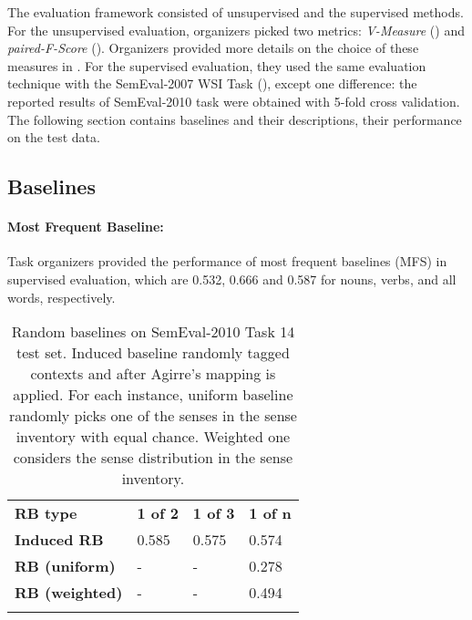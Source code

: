 The evaluation framework consisted of unsupervised and the supervised methods. For the unsupervised evaluation, organizers picked two metrics: \emph{V-Measure} (\cite{rosenberg07vmeasure}) and \emph{paired-F-Score} (\cite{artiles09weps}). Organizers provided more details on the choice of these measures in \cite{manandhar2010semeval}. For the supervised evaluation, they used the same evaluation technique with the SemEval-2007 WSI Task (\cite{agirre07semeval}), except one difference: the reported results of SemEval-2010 task were obtained with 5-fold cross validation.  \\

The following section contains baselines and their descriptions, their performance on the test data. 



\subsection{Baselines}
\label{semeval10-baselines}

\paragraph{Most Frequent Baseline:} Task organizers provided the performance of most frequent baselines (MFS) in supervised evaluation, which are 0.532, 0.666 and 0.587 for nouns, verbs, and all words, respectively.

\begin{table}
\begin{center}
    \begin{tabular}{  l | l | l | l }
    \Xhline{2\arrayrulewidth}  \bf RB type  & \bf 1 of 2 & \bf 1 of 3 & \bf 1 of n \\ \Xhline{2\arrayrulewidth}
    \bf Induced RB & 0.585 & 0.575 & 0.574 \\ \hline
    \bf RB (uniform) & - & - & 0.278 \\ 
    \bf RB (weighted) & - & - & 0.494 \\ \Xhline{2\arrayrulewidth}
    \end{tabular}
\end{center}
    \caption{\label{table:semeval10-random-baseline} Random baselines on SemEval-2010 Task 14 test set. Induced baseline randomly tagged contexts and after Agirre's mapping is applied. For each instance, uniform baseline randomly picks one of the senses in the sense inventory with equal chance. Weighted one considers the sense distribution in the sense inventory.}
\end{table}


